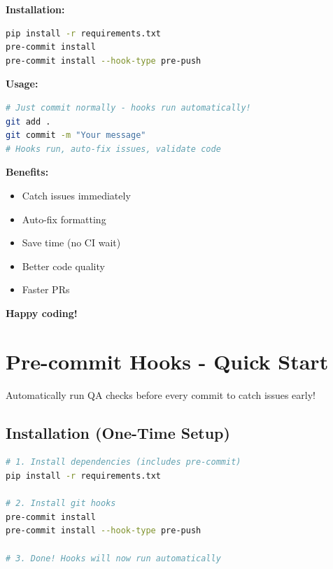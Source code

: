 \begin{record}

\textbf{Installation:}

\begin{lstlisting}[language=bash]
pip install -r requirements.txt
pre-commit install
pre-commit install --hook-type pre-push
\end{lstlisting}

\textbf{Usage:}

\begin{lstlisting}[language=bash]
# Just commit normally - hooks run automatically!
git add .
git commit -m "Your message"
# Hooks run, auto-fix issues, validate code
\end{lstlisting}

\textbf{Benefits:}

\begin{itemize}
\tightlist
\item
  \ok{} Catch issues immediately
\item
  \ok{} Auto-fix formatting
\item
  \ok{} Save time (no CI wait)
\item
  \ok{} Better code quality
\item
  \ok{} Faster PRs
\end{itemize}

\textbf{Happy coding!} \notemark{}

\end{record}

\section{Pre-commit Hooks - Quick Start}\label{cr:app:archive-quickstart-precommit}

\begin{record}

Automatically run QA checks before every commit to catch issues early!

\end{record}

\subsection{Installation (One-Time Setup)}\label{cr:app:archive-quickstart-precommit:installation-one-time-setup}

\begin{record}

\begin{lstlisting}[language=bash]
# 1. Install dependencies (includes pre-commit)
pip install -r requirements.txt

# 2. Install git hooks
pre-commit install
pre-commit install --hook-type pre-push

# 3. Done! Hooks will now run automatically
\end{lstlisting}

\end{record}

